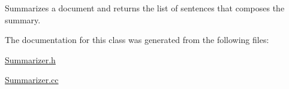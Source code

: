 Summarizes a document and returns the list of sentences that composes the summary. 



The documentation for this class was generated from the following files\+:\begin{DoxyCompactItemize}
\item 
\hyperlink{Summarizer_8h}{Summarizer.\+h}\item 
\hyperlink{Summarizer_8cc}{Summarizer.\+cc}\end{DoxyCompactItemize}
